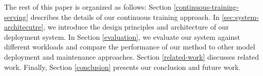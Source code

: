 The rest of this paper is organized as follows:
Section \ref{continuous-training-serving} describes the details of our continuous training approach.
In \ref{sec:system-architecutre}, we introduce the design principles and architecture of our deployment system.
In Section \ref{evaluation}, we evaluate our system against different workloads and compare the performance of our method to other model deployment and maintenance approaches. 
Section \ref {related-work} discusses related work.
Finally, Section \ref{conclusion} presents our conclusion and future work.
